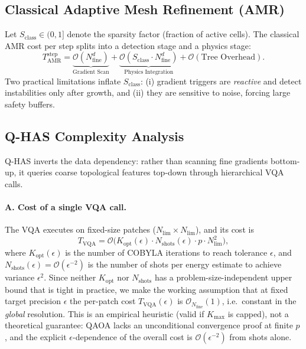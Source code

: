 \documentclass[12pt, a4paper, oneside]{report}
\begin{document}
\subsection*{Classical Adaptive Mesh Refinement (AMR)}
Let $S_{\text{class}} \in (0,1]$ denote the sparsity factor (fraction of active cells). The classical AMR cost per step splits into a detection stage and a physics stage:
\begin{equation}
    T_{\text{AMR}}^{\text{step}} = \underbrace{\mathcal{O}(N_{\text{fine}}^d)}_{\text{Gradient Scan}} + \underbrace{\mathcal{O}(S_{\text{class}} \cdot N_{\text{fine}}^d)}_{\text{Physics Integration}} + \mathcal{O}(\text{Tree Overhead}).
\end{equation}
Two practical limitations inflate $S_{\text{class}}$: (i) gradient triggers are \emph{reactive} and detect instabilities only after growth, and (ii) they are sensitive to noise, forcing large safety buffers.

\subsection*{Q-HAS Complexity Analysis}
Q-HAS inverts the data dependency: rather than scanning fine gradients bottom-up, it queries coarse topological features top-down through hierarchical VQA calls.

\paragraph{A. Cost of a single VQA call.}
The VQA executes on fixed-size patches ($N_{\text{lim}} \times N_{\text{lim}}$), and its cost is
\begin{equation}
    T_{\text{VQA}} = \mathcal{O}\bigl( K_{\text{opt}}(\epsilon) \cdot N_{\text{shots}}(\epsilon) \cdot p \cdot N_{\text{lim}}^2 \bigr),
\end{equation}
where $K_{\text{opt}}(\epsilon)$ is the number of COBYLA iterations to reach tolerance $\epsilon$, and $N_{\text{shots}}(\epsilon) = \mathcal{O}(\epsilon^{-2})$ is the number of shots per energy estimate to achieve variance $\epsilon^2$. Since neither $K_{\text{opt}}$ nor $N_{\text{shots}}$ has a problem-size-independent upper bound that is tight in practice, we make the working assumption that at fixed target precision $\epsilon$ the per-patch cost $T_{\text{VQA}}(\epsilon)$ is $\mathcal{O}_{N_{\text{fine}}}(1)$, i.e.\ constant in the \emph{global} resolution. This is an empirical heuristic (valid if $K_{\text{max}}$ is capped), not a theoretical guarantee: QAOA lacks an unconditional convergence proof at finite $p$ \cite{farhi2014,zhou2020qaoa}, and the explicit $\epsilon$-dependence of the overall cost is $\mathcal{O}(\epsilon^{-2})$ from shots alone.
\end{document}
